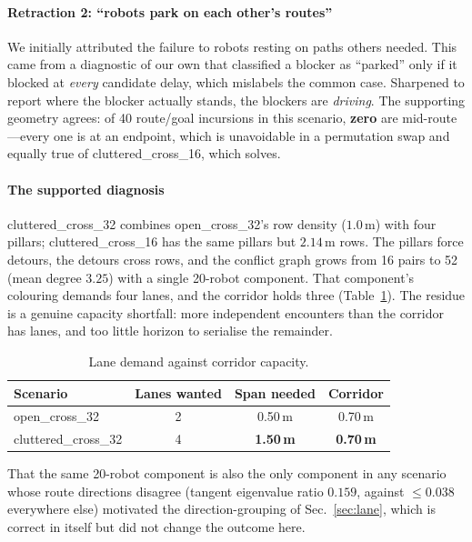 \documentclass[conference]{IEEEtran}
\begin{document}
\paragraph{Retraction 2: ``robots park on each other's routes''} We initially attributed
the failure to robots resting on paths others needed. This came from a diagnostic of our own
that classified a blocker as ``parked'' only if it blocked at \emph{every} candidate delay,
which mislabels the common case. Sharpened to report where the blocker actually stands, the
blockers are \emph{driving}. The supporting geometry agrees: of 40 route/goal incursions in
this scenario, \textbf{zero} are mid-route---every one is at an endpoint, which is
unavoidable in a permutation swap and equally true of cluttered\_cross\_16, which solves.

\paragraph{The supported diagnosis} cluttered\_cross\_32 combines open\_cross\_32's row
density ($1.0$\,m) with four pillars; cluttered\_cross\_16 has the same pillars but
$2.14$\,m rows. The pillars force detours, the detours cross rows, and the conflict graph
grows from 16 pairs to 52 (mean degree $3.25$) with a single 20-robot component. That
component's colouring demands four lanes, and the corridor holds three
(Table~\ref{tab:capacity}). The residue is a genuine capacity shortfall: more independent
encounters than the corridor has lanes, and too little horizon to serialise the remainder.

\begin{table}[t]
\caption{Lane demand against corridor capacity.}
\label{tab:capacity}
\centering
\small
\begin{tabular}{@{}lccc@{}}
\toprule
Scenario & Lanes wanted & Span needed & Corridor \\
\midrule
open\_cross\_32      & 2 & 0.50\,m & 0.70\,m \\
cluttered\_cross\_32 & 4 & \textbf{1.50\,m} & \textbf{0.70\,m} \\
\bottomrule
\end{tabular}
\end{table}

That the same 20-robot component is also the only component in any scenario whose route
directions disagree (tangent eigenvalue ratio $0.159$, against $\le 0.038$ everywhere else)
motivated the direction-grouping of Sec.~\ref{sec:lane}, which is correct in itself but did
not change the outcome here.
\end{document}
